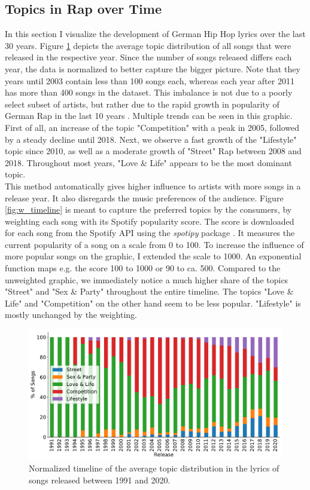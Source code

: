 \documentclass[conference]{IEEEtran}
\begin{document}
\subsection{Topics in Rap over Time}
In this section I visualize the development of German Hip Hop lyrics over the last 30 years. Figure \ref{fig:timeline} depicts the average topic distribution of all songs that were released in the respective year. Since the number of songs released differs each year, the data is normalized to better capture the bigger picture. Note that they years until 2003 contain less than 100 songs each, whereas each year after 2011 has more than 400 songs in the dataset. This imbalance is not due to a poorly select subset of artists, but rather due to the rapid growth in popularity of German Rap in the last 10 years \cite{musikindustrie}. Multiple trends can be seen in this graphic. First of all, an increase of the topic "Competition" with a peak in 2005, followed by a steady decline until 2018. Next, we observe a fast growth of the "Lifestyle" topic since 2010, as well as a moderate growth of "Street" Rap between 2008 and 2018. Throughout most years, "Love \& Life" appears to be the most dominant topic.\\
This method automatically gives higher influence to artists with more songs in a release year. It also disregards the music preferences of the audience. Figure \ref{fig:w_timeline} is meant to capture the preferred topics by the consumers, by weighting each song with its Spotify popularity score. The score is downloaded for each song from the Spotify API using the \textit{spotipy} package \cite{spotipy}. It measures the current popularity of a song on a scale from 0 to 100. To increase the influence of more popular songs on the graphic, I extended the scale to 1000. An exponential function maps e.g. the score 100 to 1000 or 90 to ca. 500. Compared to the unweighted graphic, we immediately notice a much higher share of the topics "Street" and "Sex \& Party" throughout the entire timeline. The topics "Love \& Life" and "Competition" on the other hand seem to be less popular. "Lifestyle" is mostly unchanged by the weighting.

\begin{figure}[!t]
\includegraphics[width=\linewidth]{figures/timeline.pdf}
\vspace*{-8mm}
\caption{Normalized timeline of the average topic distribution in the lyrics of songs released between 1991 and 2020.}
\label{fig:timeline}
\end{figure}
\end{document}
